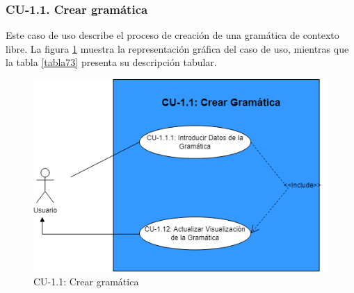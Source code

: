\subsubsection{CU-1.1. Crear gramática}

Este caso de uso describe el proceso de creación de una gramática de contexto libre. La figura \ref{fig:CU1.1_CrearGramatica} muestra la representación gráfica del caso de uso, mientras que la tabla \ref{tabla73} presenta su descripción tabular.

 \begin{figure}[H]
       \begin{center} 
 	\includegraphics[scale=0.55]{figuras/Cap7/CU11.png}
 	\caption{CU-1.1: Crear gramática}
 	\label{fig:CU1.1_CrearGramatica}
       \end{center}
   \end{figure}

